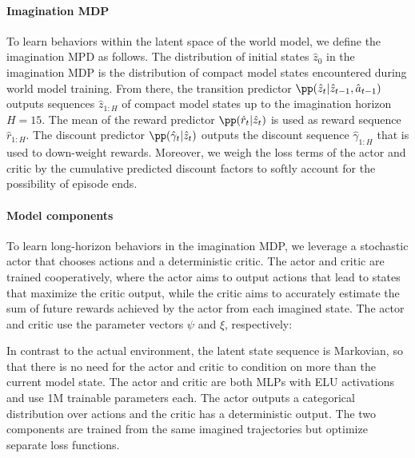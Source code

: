 \paragraph{Imagination MDP}

To learn behaviors within the latent space of the world model, we define the imagination MPD as follows. The distribution of initial states $\hat{z}_0$ in the imagination MDP is the distribution of compact model states encountered during world model training. From there, the transition predictor $\pp(\hat{z}_t | \hat{z}_{t-1},\hat{a}_{t-1})$ outputs sequences $\hat{z}_{1:H}$ of compact model states up to the imagination horizon $H=15$. The mean of the reward predictor $\pp(\hat{r}_t|\hat{z}_t)$ is used as reward sequence $\hat{r}_{1:H}$. The discount predictor $\pp(\hat{\gamma}_t|\hat{z}_t)$ outputs the discount sequence $\hat{\gamma}_{1:H}$ that is used to down-weight rewards. Moreover, we weigh the loss terms of the actor and critic by the cumulative predicted discount factors to softly account for the possibility of episode ends.



\paragraph{Model components}

To learn long-horizon behaviors in the imagination MDP, we leverage a stochastic actor that chooses actions and a deterministic critic. The actor and critic are trained cooperatively, where the actor aims to output actions that lead to states that maximize the critic output, while the critic aims to accurately estimate the sum of future rewards achieved by the actor from each imagined state. The actor and critic use the parameter vectors $\psi$ and $\xi$, respectively:


In contrast to the actual environment, the latent state sequence is Markovian, so that there is no need for the actor and critic to condition on more than the current model state. The actor and critic are both MLPs with ELU activations \citep{clevert2015elu} and use 1M trainable parameters each. The actor outputs a categorical distribution over actions and the critic has a deterministic output. The two components are trained from the same imagined trajectories but optimize separate loss functions.

